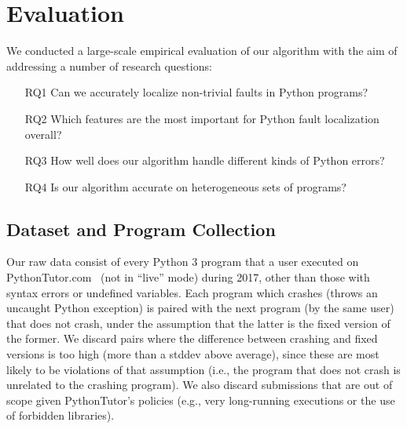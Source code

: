 \documentclass[conference]{IEEEtran}
\begin{document}


\section{Evaluation}
\label{sec-eval}

We conducted a large-scale empirical evaluation of our algorithm with the
aim of addressing a number of research questions:
\begin{enumerate}

\item[RQ1]{Can we accurately localize non-trivial faults in Python
programs?}

\item[RQ2]{Which features are the most important for Python fault
localization overall?}


\item[RQ3]{How well does our algorithm handle different kinds of Python errors?}

\item[RQ4]{Is our algorithm accurate on heterogeneous sets of programs?}

\end{enumerate}

\subsection{Dataset and Program Collection}

Our raw data consist of every Python 3 program that a user executed on
PythonTutor.com~\cite{Guo2013-vu} (not in ``live'' mode) during 2017, other
than those with syntax errors or undefined variables.  Each program which
crashes (throws an uncaught Python exception) is paired with the next
program (by the same user) that does not crash, under the assumption that
the latter is the fixed version of the former. We discard pairs where the
difference between crashing and fixed versions is too high (more than a
stddev above average), since these are most likely to be violations of that
assumption (i.e., the program that does not crash is unrelated to the
crashing program). We also discard submissions that are out of scope given
PythonTutor's policies (e.g., very long-running executions or the
use of forbidden libraries).
\end{document}
